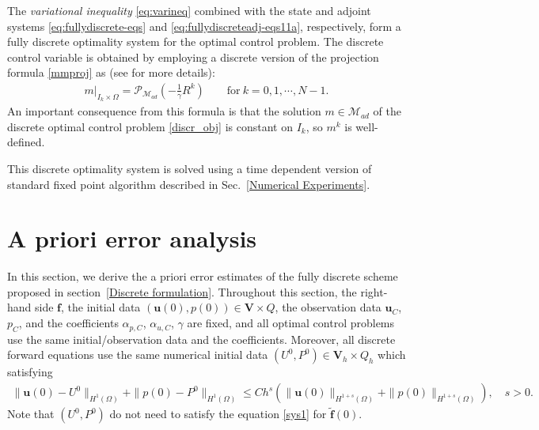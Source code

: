 \documentclass{amsart}
\begin{document}
{%
 The \textit{variational inequality} \eqref{eq:varineq} combined with the state and adjoint systems \eqref{eq:fullydiscrete-eqs} and \eqref{eq:fullydiscreteadj-eqs11a}, respectively, form a fully discrete optimality system for the optimal control problem. The discrete control variable is obtained by employing a discrete version of the projection formula \eqref{mmproj} as (see \cite[Section~4]{MR2644299} for more details):
 \begin{align}\label{proj}
 	{m |_{I_k \times \Omega} = \mathcal{P}_{\mathcal{M}_{ad}} \left(-\frac{1}{\gamma}R^{k}\right) \qquad \text{for} \ k=0, 1,\cdots,N-1.}
 \end{align} 
 An important consequence from this formula is that the solution $m \in \mathcal{M}_{ad}$ of the discrete optimal control problem \eqref{discr_obj} is constant on $I_k$, so $m^k$ is well-defined.
 
 This discrete optimality system is solved using a time dependent version of standard fixed point algorithm described in Sec.~\ref{Numerical Experiments}.}

\section{A priori error analysis}\label{A priori Error analysis}
In this section, we derive the a priori error estimates of the fully discrete scheme proposed in section~\ref{Discrete formulation}. Throughout this section, the right-hand side $\boldsymbol{f}$, the initial data $(\boldsymbol{u}(0), p(0)) \in \boldsymbol{V} \times Q$, the observation data $\boldsymbol{u}_C$, $p_C$, and the coefficients $\alpha_{p,C}$, $\alpha_{u,C}$, $\gamma$ are fixed, and all optimal control problems use the same initial/observation data and the coefficients. Moreover, all discrete forward equations use the same numerical initial data $(U^0, P^0) \in \boldsymbol{V}_h \times Q_h$ which satisfying 
%
\begin{align}
    \label{eq:initial-data-assumption}
    \|\boldsymbol{u}(0)-U^0\|_{H^1(\Omega)}+\|p(0)-P^0\|_{H^1(\Omega)}\le C h^{s}(\|\boldsymbol{u}(0)\|_{H^{1+s}(\Omega)}+\|p(0)\|_{H^{1+s}(\Omega)}), \quad s >0.
\end{align}
%
Note that $(U^0, P^0)$ do not need to satisfy the equation \eqref{sys1} for $\tilde{\boldsymbol{f}}(0)$. 
\end{document}
